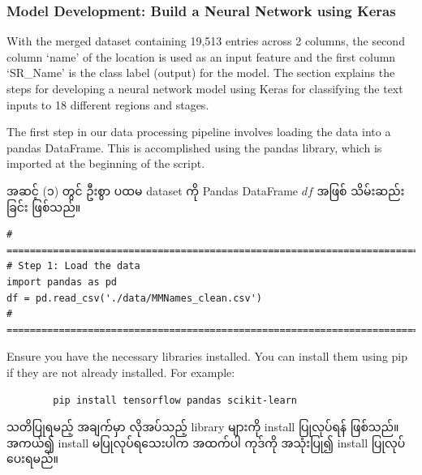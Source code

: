 \subsubsection{Model Development: Build a Neural Network using Keras}
With the merged dataset containing 19,513 entries across 2 columns, the second column `name' of the location is used as an input feature and the first column `SR\_Name' is the class label (output) for the model. The section explains the steps for developing a neural network model using Keras for classifying the text inputs to 18 different regions and stages.  

\begin{step} 
The first step in our data processing pipeline involves loading the data into a pandas DataFrame. This is accomplished using the pandas library, which is imported at the beginning of the script.

အဆင့် (၁) တွင် ဦးစွာ ပထမ  dataset ကို Pandas DataFrame $df$ အဖြစ် သိမ်းဆည်းခြင်း ဖြစ်သည်။ 

\begin{lstlisting}
# =========================================================================#
# Step 1: Load the data
import pandas as pd
df = pd.read_csv('./data/MMNames_clean.csv')
# =========================================================================#
\end{lstlisting}
\end{step}
\begin{remark}
    Ensure you have the necessary libraries installed. You can install them using pip if they are not already installed. For example: 
    \begin{lstlisting}
        pip install tensorflow pandas scikit-learn
    \end{lstlisting}
    သတိပြုရမည့် အချက်မှာ လိုအပ်သည့် library များကို  install ပြုလုပ်ရန် ဖြစ်သည်။ အကယ်၍ install မပြုလုပ်ရသေးပါက အထက်ပါ ကုဒ်ကို အသုံးပြု၍ install ပြုလုပ်ပေးရမည်။ 
\end{remark}
